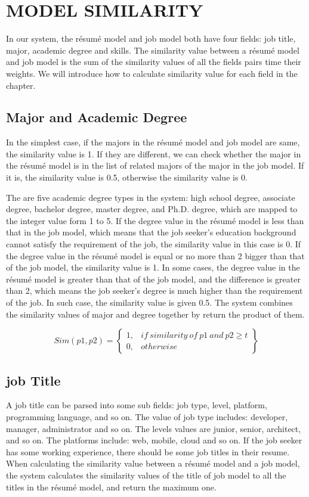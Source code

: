 \chapter{MODEL SIMILARITY}

In our system, the r\'esum\'e model and job model both have four fields: job title, major, academic degree and skills. The similarity value between a r\'esum\'e model and job model is the sum of the similarity values of all the fields pairs time their weights. We will introduce how to calculate similarity value for each field in the chapter. 

\section{Major and Academic Degree} 

In the simplest case, if the majors in the r\'esum\'e model and job model are same, the similarity value is 1. If they are different, we can check whether the major in the r\'esum\'e model is in the list of related majors of the major in the job model. If it is, the similarity value is 0.5, otherwise the similarity value is 0. 
  
The are five academic degree types in the system:  high school degree, associate degree, bachelor degree, master degree, and Ph.D. degree, which are mapped to the integer value form 1 to 5. If the degree value in the r\'esum\'e model is less than that in the job model, which means that the job seeker's education background cannot satisfy the requirement of the job, the similarity value in this case is 0. If the degree value in the r\'esum\'e model is equal or no more than 2 bigger than that of the job model, the similarity value is 1. In some cases, the degree value in the r\'esum\'e model is greater than that of the job model, and the difference is greater than 2, which means the job seeker's degree is much higher than the requirement of the job. In such case, the similarity value is given 0.5. The system combines the similarity values of major and degree together by return the product of them. 

$$ Sim(p1, p2) = \begin{Bmatrix}
1, & if~similarity~of~p1~and~p2 \geqslant t\\
0, & otherwise
\end{Bmatrix} $$

\section{job Title}

A job title can be parsed into some sub fields: job type, level, platform, programming language, and so on.  The value of job type includes: developer, manager, administrator and so on. The levels values are junior, senior, architect, and so on. The platforms include: web, mobile, cloud and so on. If the job seeker has some working experience, there should be some job titles in their resume.  When calculating the similarity value between a r\'esum\'e model and a job model, the system calculates the similarity values of the title of job model to all the titles in the r\'esum\'e model, and return the maximum one. 
   